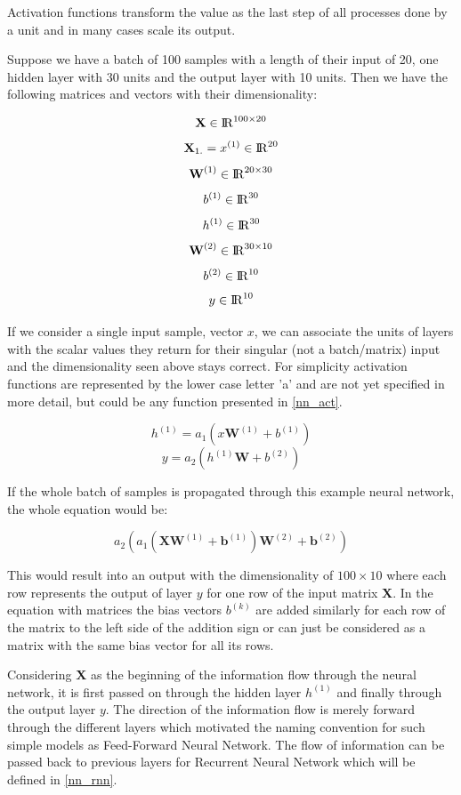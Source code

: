 Activation functions transform the value as the last step of all processes done by a unit and in many cases scale its output. 

Suppose we have a batch of 100 samples with a length of their input of 20, one hidden layer with 30 units and the output layer with 10 units. Then we have the following matrices and vectors with their dimensionality:
 
\[    \textbf{X} \in {\rm I\!R}^{100 \times 20}  \]
\[    \textbf{X}_{1 .} = x^{(1)} \in {\rm I\!R}^{20}  \]
\[    \textbf{W}^{(1)} \in {\rm I\!R}^{20 \times 30}  \] 
\[    b^{(1)} \in {\rm I\!R}^{30}  \]
\[    h^{(1)} \in {\rm I\!R}^{30}  \]
\[    \textbf{W}^{(2)} \in {\rm I\!R}^{30 \times 10}  \]
\[    b^{(2)} \in {\rm I\!R}^{10}  \]
\[    y \in {\rm I\!R}^{10}  \]

If we consider a single input sample, vector $x$, we can associate the units of layers with the scalar values they return for their singular (not a batch/matrix) input and the dimensionality seen above stays correct. 
For simplicity activation functions are represented by the lower case letter 'a' and are not yet specified in more detail, but could be any function presented in \ref{nn_act}. 

\[   h^{(1)} = a_1(x\textbf{W}^{(1)} + b^{(1)})   \]
\[   y = a_2(h^{(1)} \textbf{W} + b^{(2)})   \]

If the whole batch of samples is propagated through this example neural network, the whole equation would be:

\begin{equation} 
\label{eq:1}
    a_2(a_1(\textbf{X}\textbf{W}^{(1)} + \textbf{b}^{(1)}) \textbf{W}^{(2)} + \textbf{b}^{(2)})
\end{equation}

This would result into an output with the dimensionality of $100 \times 10$ where each row represents the output of layer $y$ for one row of the input matrix \textbf{X}. In the equation with matrices the bias vectors $b^{(k)}$ are added similarly for each row of the matrix to the left side of the addition sign or can just be considered as a matrix with the same bias vector for all its rows.

Considering \textbf{X} as the beginning of the information flow through the neural network, it is first passed on through the hidden layer $h^{(1)}$ and finally through the output layer $y$. The direction of the information flow is merely forward through the different layers which motivated the naming convention for such simple models as Feed-Forward Neural Network. The flow of information can be passed back to previous layers for Recurrent Neural Network which will be defined in \ref{nn_rnn}.

